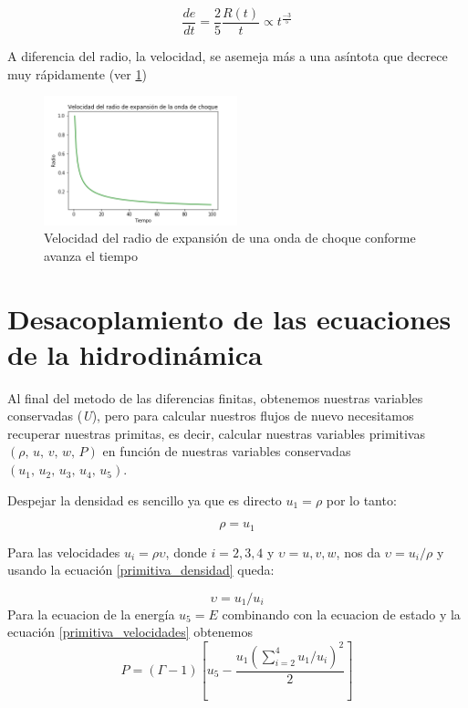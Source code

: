 \documentclass[12pt,a4paper]{book}
\begin{document}
\begin{equation}
  \dfrac{de}{dt} = \frac{2}{5}\frac{R(t)}{t} \varpropto t^{\frac{-3}{5}}
\end{equation}


A diferencia del radio, la velocidad, se asemeja más a una asíntota que decrece muy rápidamente (ver \ref{fig_velocidad_vs_radio})

\begin{figure}
  \centering
    \includegraphics[width=0.5\textwidth]{Figuras/Teoria/Velocidad_vs_tiempo.png}
  \caption{Velocidad del radio de expansión de una onda de choque conforme avanza el tiempo } \label{fig_velocidad_vs_radio}
\end{figure}


\section{Desacoplamiento de las ecuaciones de la hidrodinámica}

Al final del metodo de las diferencias finitas, obtenemos nuestras variables conservadas (\emph{U}), pero para calcular nuestros flujos de nuevo necesitamos recuperar nuestras primitas, es decir, calcular nuestras variables primitivas $(\rho, \, u, \, v,\, w, \, P )$ en función de nuestras variables conservadas $(u_1, \, u_2, \, u_3, \, u_4, \, u_5)$.

Despejar la densidad es sencillo ya que es directo $u_1= \rho$ por lo tanto:

\begin{equation}\label{primitiva_densidad}
\rho = u_1
\end{equation}

Para las velocidades $u_i=\rho \upsilon$, donde $i=2,3,4$ y $\upsilon=u,v,w$, nos da $\upsilon= u_i/ \rho$ y usando la ecuación \ref{primitiva_densidad} queda:

\begin{equation} \label{primitiva_velocidades}
\upsilon = u_1/u_i
\end{equation}
Para la ecuacion de la energía $u_5=E$ combinando con la ecuacion de estado y la ecuación \ref{primitiva_velocidades} obtenemos
\begin{equation}
P = \left( \Gamma - 1 \right) \left[ u_5 - \frac{u_1 \left( \sum_{i=2}^{4} u_1/u_i \right)^2}{2} \right]
\end{equation}
\end{document}
